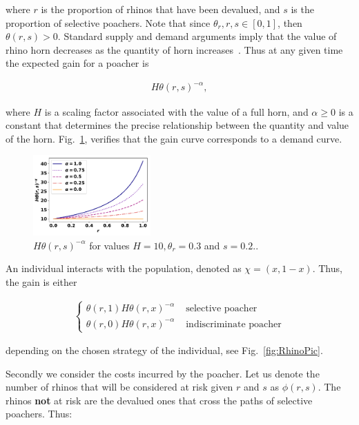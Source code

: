 \documentclass[10pt]{article}
\begin{document}
where \(r\) is the proportion of rhinos that have been devalued, and \(s\) is the 
proportion of selective poachers. Note that since \(\theta_r, r, s  \in [0, 1]\), then
\(\theta(r, s) > 0\). Standard supply and demand arguments imply that the value
of rhino horn decreases as the quantity of horn increases~\cite{mankiw2010}.
Thus at any given time the expected gain for a poacher is

\begin{eqnarray}
    \label{eqn:individual_gain}
    H \theta(r,s)^{-\alpha},
\end{eqnarray}

where \(H\) is a scaling factor associated with the value of a full horn, and 
\(\alpha \geq 0\) is a constant that determines the precise relationship between
the quantity and value of the horn.  Fig.~\ref{fig:GainCurve}, verifies that the 
gain curve corresponds to a demand curve.

\begin{figure}[!htbp]
\centering
\includegraphics[width=0.4\textwidth]{images/gain_curve.pdf}
\caption{\label{fig:GainCurve} \(H \theta(r, s) ^{- \alpha}\) for values 
\(H = 10, \theta_r = 0.3\) and \(s = 0.2.\).}
\end{figure}

An individual interacts with the population, denoted as \(\chi=(x, 1 -x )\). Thus,
the gain is either

\begin{eqnarray}
    \label{eqn:gain}
    \left\{
    \begin{array}{cl}
    \theta(r, 1) H \theta(r, x)^{-\alpha} & \mbox{ selective poacher}
    \\
    \theta(r, 0) H \theta(r, x)^{-\alpha} & \mbox{ indiscriminate poacher}
    \end{array} \right.
\end{eqnarray}

depending on the chosen strategy of the individual, see Fig.~\ref{fig:RhinoPic}.

Secondly we consider the costs incurred by the poacher. Let us denote the number
of rhinos that will be considered at risk given \(r\) and \(s\) as \(\phi(r,s)\).
The rhinos \textbf{not} at risk are the devalued ones 
that cross the paths of selective poachers. Thus:
\end{document}
